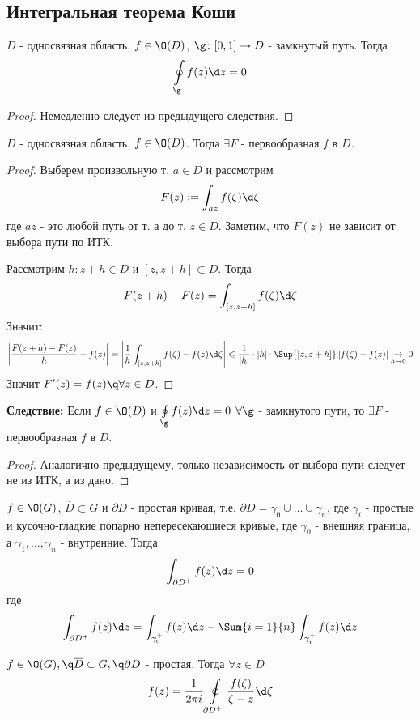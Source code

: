 \subsection{Интегральная теорема Коши}
\begin{theorem}
  $D$ - односвязная область, $f\in\O(D)$, $\g\colon[0,1]\to D$ - замкнутый путь. Тогда
  \[\oint\limits_{\g}f(z)\d z=0\]
\end{theorem}
\begin{proof}
  Немедленно следует из предыдущего следствия.
\end{proof}
\begin{theorem}
  $D$ - односвязная область, $f\in\O(D)$. Тогда $\exists F$ - первообразная $f$ в $D$. 
\end{theorem}
\begin{proof}
  Выберем произвольную т. $a\in D$ и рассмотрим
  \[F(z):= \int_{az}f(\zeta)\d \zeta\]
  где $az$ - это любой путь от т. а до т. $z\in D$. Заметим, что $F(z)$ не зависит от выбора пути по ИТК.

  Рассмотрим $h\colon z+h\in D$ и $[z,z+h]\subset D$. Тогда
  \[F(z+h)-F(z) = \int_{[z,z+h]}f(\zeta)\d \zeta\]
  Значит:
  \[\left|\frac{F(z+h)-F(z)}{h}-f(z)\right| = \left|\frac{1}{h} \int_{[z,z+h]}f(\zeta)-f(z)\d \zeta\right|\leqslant \frac{1}{|h|}\cdot |h|\cdot \Sup{[z,z+h]}\left|f(\zeta)-f(z)\right|\underset{h\to0}{\to}0\]
  Значит $F'(z) = f(z)\q\forall z\in D$.
\end{proof}
\textbf{Следствие:} Если $f\in\O(D)$ и $\oint\limits_{\g}f(z)\d z = 0$ $\forall\g$ - замкнутого пути, то $\exists F$ - первообразная $f$ в $D$. 
\begin{proof}
  Аналогично предыдущему, только независимость от выбора пути следует не из ИТК, а из дано.
\end{proof}
\begin{theorem}
  $f\in\O(G)$, $\overline{D}\subset G$ и $\partial D$ - простая кривая, т.е. $\partial D=\gamma_0\cup\dots\cup\gamma_n$, где $\gamma_i$ - простые и кусочно-гладкие попарно непересекающиеся кривые, где $\gamma_0$ - внешняя граница, а $\gamma_1,\dots,\gamma_n$ - внутренние. Тогда
  \[\int_{\partial D^+}f(z)\d z = 0\]
  где
  \[\int_{\partial D^+}f(z)\d z = \int_{\gamma_0^+}f(z)\d z - \Sum{i=1}{n}\int_{\gamma_i^+}f(z)\d z\]
\end{theorem}
\begin{theorem}
  $f\in\O(G),\q \overline{D}\subset G,\q \partial D$ - простая. Тогда $\forall z\in D$
  \[f(z) = \frac{1}{2\pi i} \oint\limits_{\partial D^+}\frac{f(\zeta)}{\zeta - z}\d \zeta\]
\end{theorem}
